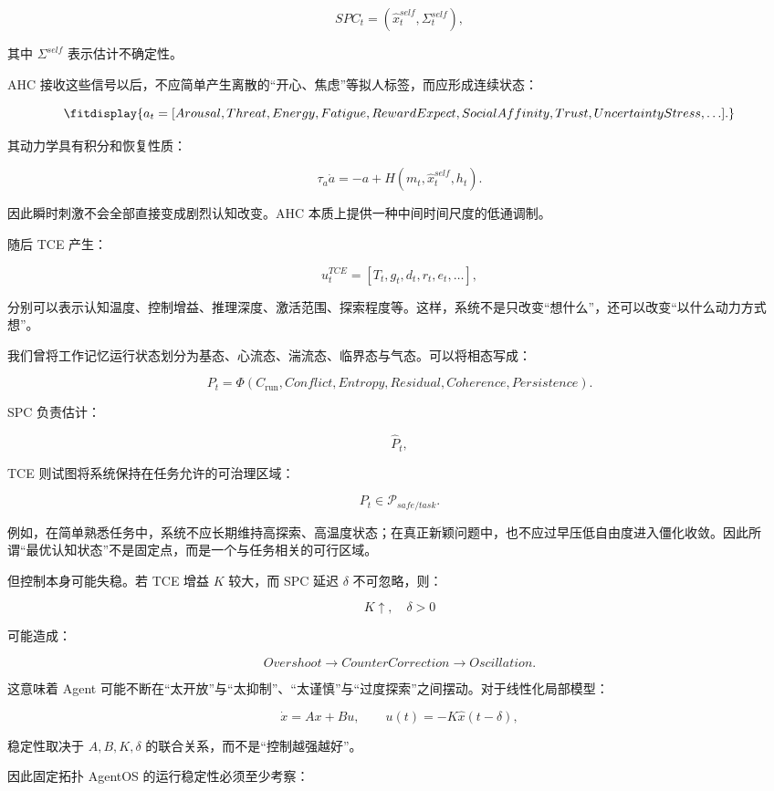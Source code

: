 \[
SPC_t
=
(\hat{x}^{self}_t,\Sigma^{self}_t),
\]

其中 $\Sigma^{self}$ 表示估计不确定性。

AHC 接收这些信号以后，不应简单产生离散的“开心、焦虑”等拟人标签，而应形成连续状态：

\[
\fitdisplay{
a_t
=
[
Arousal,
Threat,
Energy,
Fatigue,
RewardExpect,
SocialAffinity,
Trust,
UncertaintyStress,\ldots].
}
\]

其动力学具有积分和恢复性质：

\[
\tau_a\dot a
=
-a
+
H(m_t,\hat{x}^{self}_t,h_t).
\]

因此瞬时刺激不会全部直接变成剧烈认知改变。AHC 本质上提供一种中间时间尺度的低通调制。

随后 TCE 产生：

\[
u_t^{TCE}
=
[
T_t,
g_t,
d_t,
r_t,
e_t,\ldots
],
\]

分别可以表示认知温度、控制增益、推理深度、激活范围、探索程度等。这样，系统不是只改变“想什么”，还可以改变“以什么动力方式想”。

我们曾将工作记忆运行状态划分为基态、心流态、湍流态、临界态与气态。可以将相态写成：

\[
P_t
=
\Phi
\left(
C_{\mathrm{run}},
Conflict,
Entropy,
Residual,
Coherence,
Persistence
\right).
\]

SPC 负责估计：

\[
\hat P_t,
\]

TCE 则试图将系统保持在任务允许的可治理区域：

\[
P_t
\in
\mathcal{P}_{safe/task}.
\]

例如，在简单熟悉任务中，系统不应长期维持高探索、高温度状态；在真正新颖问题中，也不应过早压低自由度进入僵化收敛。因此所谓“最优认知状态”不是固定点，而是一个与任务相关的可行区域。

但控制本身可能失稳。若 TCE 增益 $K$ 较大，而 SPC 延迟 $\delta$ 不可忽略，则：

\[
K\uparrow,
\quad
\delta>0
\]

可能造成：

\[
Overshoot
\rightarrow
CounterCorrection
\rightarrow
Oscillation.
\]

这意味着 Agent 可能不断在“太开放”与“太抑制”、“太谨慎”与“过度探索”之间摆动。对于线性化局部模型：

\[
\dot x
=
Ax+Bu,
\qquad
u(t)
=
-K\hat x(t-\delta),
\]

稳定性取决于 $A,B,K,\delta$ 的联合关系，而不是“控制越强越好”。

因此固定拓扑 AgentOS 的运行稳定性必须至少考察：

